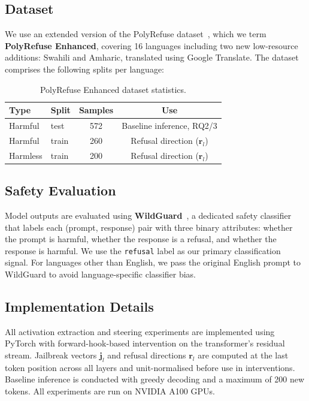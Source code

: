 \subsection{Dataset}

We use an extended version of the PolyRefuse dataset~\citep{wang2026refusal}, which we term \textbf{PolyRefuse Enhanced}, covering 16 languages including two new low-resource additions: Swahili and Amharic, translated using Google Translate. The dataset comprises the following splits per language:

\begin{table}[h]
\centering
\caption{PolyRefuse Enhanced dataset statistics.}
\label{tab:dataset}
\begin{tabular}{llcc}
\toprule
\textbf{Type} & \textbf{Split} & \textbf{Samples} & \textbf{Use} \\
\midrule
Harmful  & test  & 572 & Baseline inference, RQ2/3 \\
Harmful  & train & 260 & Refusal direction ($\mathbf{r}_l$) \\
Harmless & train & 200 & Refusal direction ($\mathbf{r}_l$) \\
\bottomrule
\end{tabular}
\end{table}

\subsection{Safety Evaluation}

Model outputs are evaluated using \textbf{WildGuard}~\citep{han2024wildguard}, a dedicated safety classifier that labels each (prompt, response) pair with three binary attributes: whether the prompt is harmful, whether the response is a refusal, and whether the response is harmful. We use the \texttt{refusal} label as our primary classification signal. For languages other than English, we pass the original English prompt to WildGuard to avoid language-specific classifier bias.

\subsection{Implementation Details}

All activation extraction and steering experiments are implemented using PyTorch with forward-hook-based intervention on the transformer's residual stream. Jailbreak vectors $\mathbf{j}_l$ and refusal directions $\mathbf{r}_l$ are computed at the last token position across all layers and unit-normalised before use in interventions. Baseline inference is conducted with greedy decoding and a maximum of 200 new tokens. All experiments are run on NVIDIA A100 GPUs.
